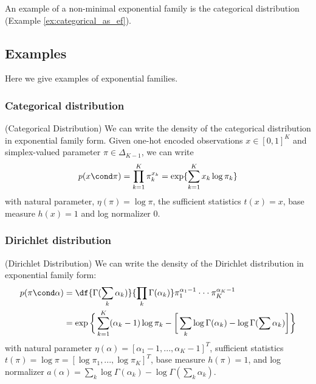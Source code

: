 \documentclass{article} %
\begin{document}
  An example of a non-minimal exponential family is the categorical distribution (Example \ref{ex:categorical_as_ef}). 


\subsection{Examples}

Here we give examples of exponential families. 
\subsubsection{Categorical distribution}

\begin{example}{(Categorical Distribution)}
\label{ex:categorical_as_ef} We can write the density of the categorical distribution in exponential family form. 	 Given one-hot encoded observations $x \in [0,1]^K$ and simplex-valued parameter $\pi \in \Delta_{K-1}$, we can write
\[p(x \cond \pi) = \prod_{k=1}^K \pi_k^{x_k} = \exp \{ \sum_{k=1}^K x_k \log \pi_k\} \]
 with natural parameter, $\eta(\pi) = \log \pi$, the sufficient statistics $t(x) = x$, base measure $h(x)=1$ and log normalizer $0$.
\end{example}

\subsubsection{Dirichlet distribution}
\begin{example}{(Dirichlet Distribution)} 
\label{ex:dirichlet_as_ef} We can write the density of the Dirichlet distribution in exponential family form:
\begin{align*}
p (\pi \cond\alpha) &= \df{\Gamma(\sum_k \alpha_k)}{\prod_k \Gamma (\alpha_k) } \pi_1^{\alpha_1 -1} \cdot \cdot \cdot \pi_K^{\alpha_K -1} \\
&= \exp \bigg\{ \sum_{k=1}^K (\alpha_k -1) \log \pi_k - \bigg[ \sum_k \log \Gamma (\alpha_k)-  \log \Gamma (\sum \alpha_k) \bigg]  \bigg\}
\end{align*}
with natural parameter $\eta(\alpha) = [\alpha_1 -1, ..., \alpha_K -1]^T$, sufficient statistics $t(\pi) = \log \pi = [\log \pi_1, ..., \log \pi_K]^T$, base measure $h(\pi)=1$, and log normalizer $a(\alpha) =  \sum_k \log \Gamma (\alpha_k ) - \log \Gamma (\sum_k \alpha_k)$. 
  
\end{example} 
\end{document}
